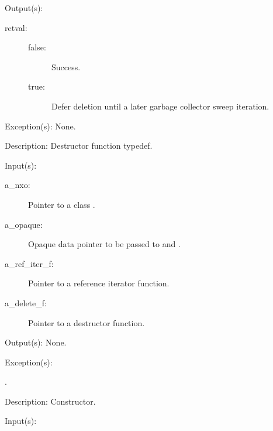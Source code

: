 \begin{capi}
\begin{capilist}
	\item[Output(s): ]
		\begin{description}\item[]
		\item[retval: ]
			\begin{description}\item[]
			\item[false: ] Success.
			\item[true: ] Defer deletion until a later garbage
			collector sweep iteration.
			\end{description}
		\end{description}
	\item[Exception(s): ] None.
	\item[Description: ]
		Destructor function typedef.
	\end{capilist}
\label{nxo_class_new}
	\begin{capilist}
	\item[Input(s): ]
		\begin{description}\item[]
		\item[a\_nxo: ]
			Pointer to a class .
		\item[a\_opaque: ]
			Opaque data pointer to be passed to
			 and .
		\item[a\_ref\_iter\_f: ]
			Pointer to a reference iterator function.
		\item[a\_delete\_f: ]
			Pointer to a destructor function.
		\end{description}
	\item[Output(s): ] None.
	\item[Exception(s): ]
		\begin{description}\item[]
		\item[.]
		\end{description}
	\item[Description: ]
		Constructor.
	\end{capilist}
\label{nxo_class_name_get}
	\begin{capilist}
	\item[Input(s): ]

\end{capilist}
\end{capi}
